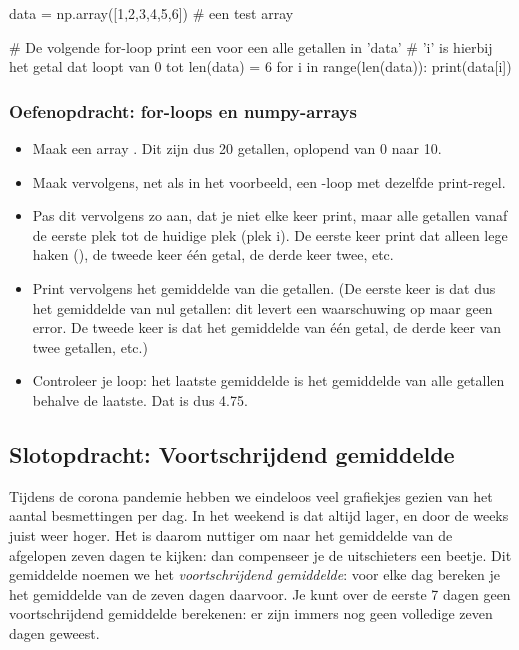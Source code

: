 \documentclass[a4paper,11pt, fleqn]{article}
\begin{document}
\begin{python}
data = np.array([1,2,3,4,5,6]) # een test array

# De volgende for-loop print een voor een alle getallen in 'data'
# 'i' is hierbij het getal dat loopt van 0 tot len(data) = 6
for i in range(len(data)):
    print(data[i])
\end{python}

\subsubsection*{Oefenopdracht: for-loops en numpy-arrays}
\begin{itemize}
	\item Maak een array . Dit zijn dus 20 getallen, oplopend van 0 naar 10.
	\item Maak vervolgens, net als in het voorbeeld, een -loop met dezelfde print-regel.
	\item Pas dit vervolgens zo aan, dat je niet elke keer  print, maar alle getallen vanaf de eerste plek tot de huidige plek (plek i). De eerste keer print dat alleen lege haken (\pythoninline{[]}), de tweede keer \'e\'en getal, de derde keer twee, etc.
	\item Print vervolgens het gemiddelde van die getallen. (De eerste keer is dat dus het gemiddelde van nul getallen: dit levert een waarschuwing op maar geen error. De tweede keer is dat het gemiddelde van \'e\'en getal, de derde keer van twee getallen, etc.)
	\item Controleer je loop: het laatste gemiddelde is het gemiddelde van alle getallen behalve de laatste. Dat is dus 4.75.
\end{itemize}

\subsection{Slotopdracht: Voortschrijdend gemiddelde}
Tijdens de corona pandemie hebben we eindeloos veel grafiekjes gezien van het aantal besmettingen per dag. In het weekend is dat altijd lager, en door de weeks juist weer hoger. Het is daarom nuttiger om naar het gemiddelde van de afgelopen zeven dagen te kijken: dan compenseer je de uitschieters een beetje. Dit gemiddelde noemen we het {\it voortschrijdend gemiddelde}: voor elke dag bereken je het gemiddelde van de zeven dagen daarvoor. Je kunt over de eerste 7 dagen geen voortschrijdend gemiddelde berekenen: er zijn immers nog geen volledige zeven dagen geweest.
\end{document}
